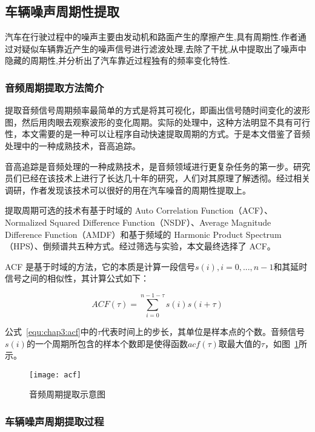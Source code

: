 \subsection{车辆噪声周期性提取}

汽车在行驶过程中的噪声主要由发动机和路面产生的摩擦产生,具有周期性.作者通过对疑似车辆靠近产生的噪声信号进行滤波处理,去除了干扰,从中提取出了噪声中隐藏的周期性,并分析出了汽车靠近过程独有的频率变化特性.

\subsubsection{音频周期提取方法简介}

提取音频信号周期频率最简单的方式是将其可视化，即画出信号随时间变化的波形图，然后用肉眼去观察波形的变化周期。实际的处理中，这种方法明显不具有可行性，本文需要的是一种可以让程序自动快速提取周期的方式。于是本文借鉴了音频处理中的一种成熟技术，音高追踪。

音高追踪是音频处理的一种成熟技术，是音频领域进行更复杂任务的第一步。研究员们已经在该技术上进行了长达几十年的研究，人们对其原理了解透彻。经过相关调研，作者发现该技术可以很好的用在汽车噪音的周期性提取上。

提取周期可选的技术有基于时域的 Auto Correlation Function（ACF）、Normalized Squared Difference Function（NSDF）、Average Magnitude Difference Function（AMDF）和基于频域的 Harmonic Product Spectrum（HPS）、倒频谱共五种方式。经过筛选与实验，本文最终选择了 ACF。

ACF 是基于时域的方法，它的本质是计算一段信号$s(i),i=0,...,n-1$和其延时信号之间的相似性，其计算公式如下：

\begin{equation}
\label{equ:chap3:acf}
ACF\left( \tau  \right) = \sum\limits_{i = 0}^{n - 1 - \tau } {s\left( i \right)s\left( {i + \tau } \right)} 
\end{equation}


公式~\ref{equ:chap3:acf}中的$\tau$代表时间上的步长，其单位是样本点的个数。音频信号$s(i)$的一个周期所包含的样本个数即是使得函数$acf(\tau)$取最大值的$\tau$，如图~\ref{fig:acf}所示。


\begin{figure}[htbp] %
  \centering
  \texttt{[image: acf]}
  \caption{音频周期提取示意图}
  \label{fig:acf}
\end{figure}



\subsubsection{车辆噪声周期提取过程}

